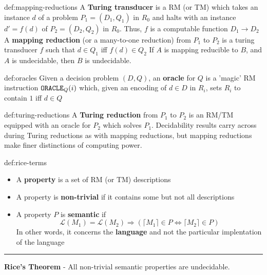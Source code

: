 \documentclass[landscape, 8pt]{extarticle}
\begin{document}
\begin{multicols}{3}
\begin{dfn}{def:mapping-reductions}{}
A \textbf{Turing transducer} is a RM (or TM) which takes an instance $d$ of a problem $P_{1} = (D_{1}, Q_{1})$ in $R_{0}$ and halts with an instance $d' = f(d)$ of $P_{2} = (D_{2}, Q_{2})$ in $R_{0}$. Thus, $f$ is a computable function $D_{1}\to D_{2}$\newline
A \textbf{mapping reduction} (or a many-to-one reduction) from $P_{1}$ to $P_{2}$ is a turing transducer $f$ such that $d\in Q_{1}$ iff $f(d)\in Q_{2}$
\newline
If $A$ is mapping reducible to $B$, and $A$ is undecidable, then $B$ is undecidable.
\end{dfn}

\begin{dfn}[Oracles]{def:oracles}{}
Given a decision problem $(D, Q)$, an \textbf{oracle} for $Q$ is a 'magic' RM instruction $\text{\texttt{ORACLE}}_{Q}(i)$ which, given an encoding of $d\in D$ in $R_{i}$, sets $R_{i}$ to contain $1$ iff $d\in Q$
\end{dfn}

\begin{dfn}{def:turing-reductions}{}
A \textbf{Turing reduction} from $P_{1}$ to $P_{2}$ is an RM/TM equipped with an oracle for $P_{2}$ which solves $P_{1}$.\newline
Decidability results carry across during Turing reductions as with mapping reductions, but mapping reductions make finer distinctions of computing power.
\end{dfn}

\begin{thm}{def:rice-terms}{}
\renewcommand\labelitemi{\tiny$\bullet$}
\begin{itemize}
    \setlength\itemsep{0em}
    \item A \textbf{property} is a set of RM (or TM) descriptions
    \item A property is \textbf{non-trivial} if it contains some but not all descriptions
    \item A property $P$ is \textbf{semantic} if
    \[\mathcal{L}(M_{1}) =\mathcal{L}(M_{2}) \Rightarrow (\lceil M_{1} \rceil \in P \Leftrightarrow \lceil M_{2} \rceil \in P)\]
    In other words, it concerns the \textbf{language} and not the particular implentation of the language
\end{itemize}
\noindent\rule{\textwidth}{0.2pt}
\textbf{Rice's Theorem} - All non-trivial semantic properties are undecidable.\end{thm}


\end{multicols}
\end{document}
